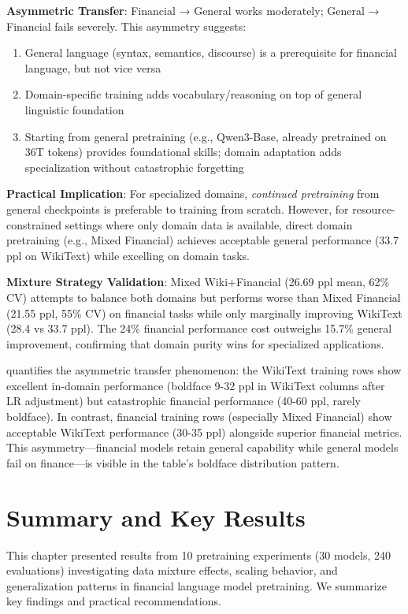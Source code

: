 \textbf{Asymmetric Transfer}: Financial → General works moderately; General → Financial fails severely. This asymmetry suggests:
\begin{enumerate}
\item General language (syntax, semantics, discourse) is a prerequisite for financial language, but not vice versa
\item Domain-specific training adds vocabulary/reasoning on top of general linguistic foundation
\item Starting from general pretraining (e.g., Qwen3-Base, already pretrained on 36T tokens) provides foundational skills; domain adaptation adds specialization without catastrophic forgetting
\end{enumerate}

\textbf{Practical Implication}: For specialized domains, \textit{continued pretraining} from general checkpoints is preferable to training from scratch. However, for resource-constrained settings where only domain data is available, direct domain pretraining (e.g., Mixed Financial) achieves acceptable general performance (33.7 ppl on WikiText) while excelling on domain tasks.

\textbf{Mixture Strategy Validation}: Mixed Wiki+Financial (26.69 ppl mean, 62\% CV) attempts to balance both domains but performs worse than Mixed Financial (21.55 ppl, 55\% CV) on financial tasks while only marginally improving WikiText (28.4 vs 33.7 ppl). The 24\% financial performance cost outweighs 15.7\% general improvement, confirming that domain purity wins for specialized applications.



 quantifies the asymmetric transfer phenomenon: the WikiText training rows show excellent in-domain performance (boldface 9-32 ppl in WikiText columns after LR adjustment) but catastrophic financial performance (40-60 ppl, rarely boldface). In contrast, financial training rows (especially Mixed Financial) show acceptable WikiText performance (30-35 ppl) alongside superior financial metrics. This asymmetry—financial models retain general capability while general models fail on finance—is visible in the table's boldface distribution pattern.

\section{Summary and Key Results}

This chapter presented results from 10 pretraining experiments (30 models, 240 evaluations) investigating data mixture effects, scaling behavior, and generalization patterns in financial language model pretraining. We summarize key findings and practical recommendations.

